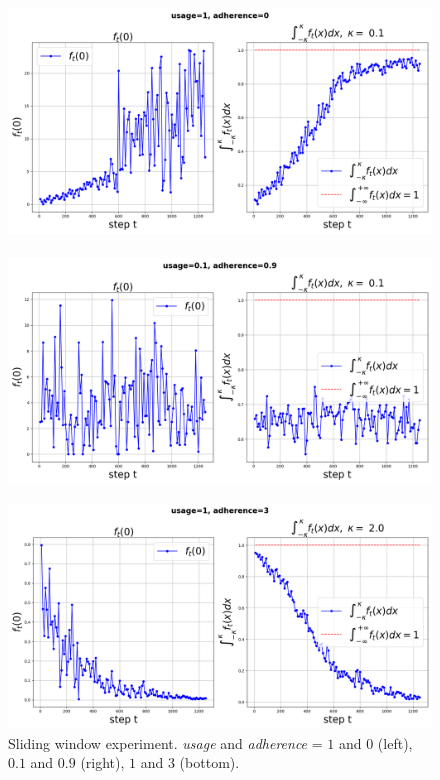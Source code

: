 \documentclass{article}
\begin{document}
        \begin{figure}[h!]
            \centering
            \includegraphics[width=0.49\linewidth]{pictures/ft0_loop_1_0.png}~~
            ~~\includegraphics[width=0.49\linewidth]{pictures/ft0_loop_0.1_0.9.png}
            
            \includegraphics[width=0.49\linewidth]{pictures/ft0_loop_1_3.png}
            
            \caption{Sliding window experiment. \textit{usage} and \textit{adherence} = $1$ and $0$ (left), $0.1$ and $0.9$ (right), $1$ and $3$ (bottom).}
            \label{delta_loop}
        \end{figure}

\newpage
\end{document}
